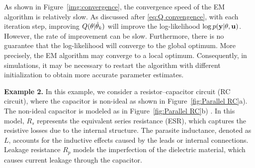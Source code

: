 \begin{remark}
    As shown in Figure~\ref{img:convergence}, the convergence speed of the EM algorithm is relatively slow. As discussed after \eqref{eq:Q convengence}, with each iteration step, improving $Q({ \mathrm{\theta} } | \hat{{ \mathrm{\theta} }}_k)$ will improve the log-likelihood $\log p(\mathbf{\mathbf{y}}|{ \mathrm{\theta} },\mathbf{u})$. However, the rate of improvement can be slow. Furthermore, there is no guarantee that the log-likelihood will converge to the global optimum. More precisely, the EM algorithm may converge to a local optimum. Consequently, in simulations, it may be necessary to restart the algorithm with different initialization to obtain more accurate parameter estimates.
\end{remark}


\textbf{Example 2.} In this example, we consider a resistor–capacitor circuit (RC circuit), where the capacitor is non-ideal as shown in Figure~\ref{fig:Parallel RC}a). The non-ideal capacitor is modeled as in Figure~\ref{fig:Parallel RC}b) \cite{bisquert2000role}. In this model, $R_s$ represents the equivalent series resistance (ESR), which captures the resistive losses due to the internal structure. The parasite inductance, denoted as $L$, accounts for the inductive effects caused by the leads or internal connections. Leakage resistance $R_p$ models the imperfection of the dielectric material, which causes current leakage through the capacitor. 




